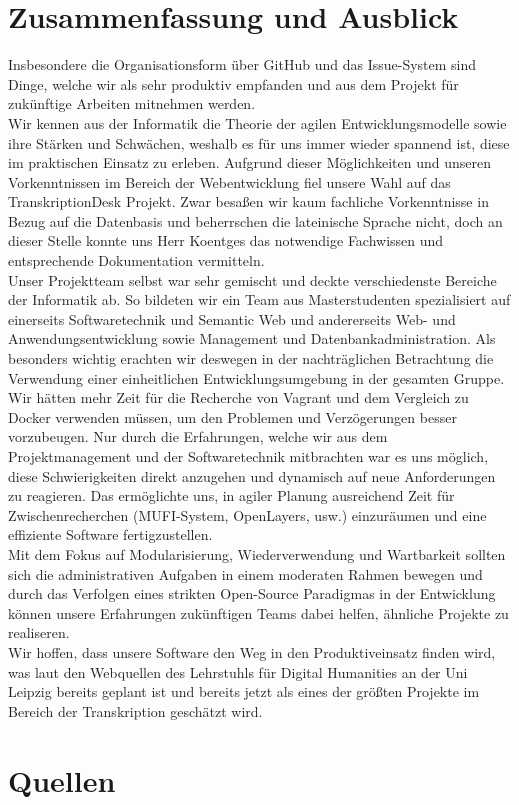 \documentclass{article}
\begin{document}
\section{Zusammenfassung und Ausblick}
Insbesondere die Organisationsform über GitHub und das Issue-System sind Dinge, welche wir als sehr produktiv empfanden und aus dem Projekt für zukünftige Arbeiten mitnehmen werden.\\
Wir kennen aus der Informatik die Theorie der agilen Entwicklungsmodelle sowie ihre Stärken und Schwächen, weshalb es für uns immer wieder spannend ist, diese im praktischen Einsatz zu erleben.
Aufgrund dieser Möglichkeiten und unseren Vorkenntnissen im Bereich der Webentwicklung fiel unsere Wahl auf das TranskriptionDesk Projekt.
Zwar besaßen wir kaum fachliche Vorkenntnisse in Bezug auf die Datenbasis und beherrschen die lateinische Sprache nicht, doch an dieser Stelle konnte uns Herr Koentges das notwendige Fachwissen und entsprechende Dokumentation vermitteln.\\
Unser Projektteam selbst war sehr gemischt und deckte verschiedenste Bereiche der Informatik ab. So bildeten wir ein Team aus Masterstudenten 
spezialisiert auf einerseits Softwaretechnik und Semantic Web und andererseits Web- und Anwendungsentwicklung sowie Management und Datenbankadministration.
Als besonders wichtig erachten wir deswegen in der nachträglichen Betrachtung die Verwendung einer einheitlichen Entwicklungsumgebung in der gesamten Gruppe. \\
Wir hätten mehr Zeit für die Recherche von Vagrant und dem Vergleich zu Docker verwenden müssen, um den Problemen und Verzögerungen besser vorzubeugen.
Nur durch die Erfahrungen, welche wir aus dem Projektmanagement und der Softwaretechnik mitbrachten war es uns möglich, diese Schwierigkeiten direkt anzugehen und dynamisch auf neue Anforderungen zu reagieren.
Das ermöglichte uns, in agiler Planung ausreichend Zeit für Zwischenrecherchen (MUFI-System, OpenLayers, usw.) einzuräumen und eine effiziente Software fertigzustellen.\\
Mit dem Fokus auf Modularisierung, Wiederverwendung und Wartbarkeit sollten sich die administrativen Aufgaben in einem moderaten Rahmen bewegen und 
durch das Verfolgen eines strikten Open-Source Paradigmas in der Entwicklung können unsere Erfahrungen zukünftigen Teams dabei helfen, ähnliche Projekte zu realiseren.\\
Wir hoffen, dass unsere Software den Weg in den Produktiveinsatz finden wird, was laut den Webquellen des Lehrstuhls für Digital Humanities an der Uni Leipzig bereits geplant ist und bereits jetzt als eines der größten Projekte im Bereich der Transkription geschätzt wird.

\section*{Quellen}
  \printbibliography[%
    heading=bibintoc, %
  ]
\end{document}
